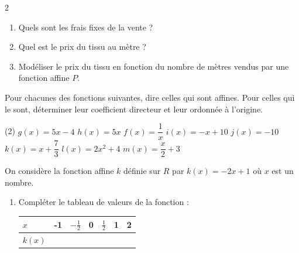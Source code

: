 \documentclass[10pt,a4paper]{article}
\begin{document}
\begin{multicols}{2}
\begin{exo}[][]
            \begin{enumerate}
                \item Quels sont les frais fixes de la vente ?
                \item Quel est le prix du tissu au mètre ?
                \item Modéliser le prix du tissu en fonction du nombre de mètres vendus par une fonction affine \(P\).
            \end{enumerate}
\end{exo}

\begin{exo}[][]
Pour chacunes des fonctions suivantes, dire celles qui sont affines. Pour celles qui le sont, déterminer leur coefficient directeur et leur ordonnée à l'origine.
\begin{tasks}(2)
\task \(g(x) = 5x-4\)
\task \(h(x) = 5x\)
\task \(f(x) = \dfrac{1}{x}\)
\task \(i(x) = -x+10\)
\task \(j(x) = -10\)
\task \(k(x) = x+\dfrac{7}{3}\)
\task \(l(x) = 2x^2+4\)
\task \(m(x) = \dfrac{x}{2}+ 3\)
\end{tasks}
\end{exo}


\begin{exo}
On considère la fonction affine \(k\) définie sur \(R\) par \(k(x) = -2x + 1\) où \(x\) est un nombre.
\begin{enumerate}
    \item Compléter le tableau de valeurs de la fonction :
    \begin{center}
        \renewcommand{\arraystretch}{1.5}
        \setlength{\tabcolsep}{1em}
        \begin{tabular}{l|c|c|c|c|c|c}
           \(x\)    & -1 & \(-\frac{1}{2}\) & 0 & \(\frac{1}{2}\) & 1 & 2 \\ \hline
           \(k(x)\) & & & & & & \\
        \end{tabular}
    \end{center}


\end{enumerate}
\end{exo}
\end{multicols}
\end{document}
